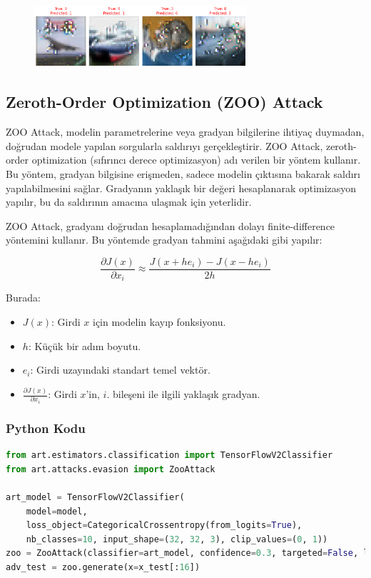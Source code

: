 \begin{figure}[h]
    \centering
    \includegraphics[width=0.7\textwidth]{images/wasserstein_attack_results.png}
    \caption{}
\end{figure}

\newpage

\subsection{Zeroth-Order Optimization (ZOO) Attack}

ZOO Attack, modelin parametrelerine veya gradyan bilgilerine ihtiyaç duymadan, doğrudan modele yapılan sorgularla saldırıyı gerçekleştirir. ZOO Attack, zeroth-order optimization (sıfırıncı derece optimizasyon) adı verilen bir yöntem kullanır. Bu yöntem, gradyan bilgisine erişmeden, sadece modelin çıktısına bakarak saldırı yapılabilmesini sağlar. Gradyanın yaklaşık bir değeri hesaplanarak optimizasyon yapılır, bu da saldırının amacına ulaşmak için yeterlidir.

ZOO Attack, gradyanı doğrudan hesaplamadığından dolayı finite-difference yöntemini kullanır. Bu yöntemde gradyan tahmini aşağıdaki gibi yapılır:

\[ \frac{\partial J(x)}{\partial x_i} \approx \frac{J(x + h e_i) - J(x - h e_i)}{2h} \]

Burada:

\begin{itemize}
    \item $J(x)$: Girdi $x$ için modelin kayıp fonksiyonu.
    \item $h$: Küçük bir adım boyutu.
    \item $e_i$: Girdi uzayındaki standart temel vektör.
    \item $\frac{\partial J(x)}{\partial x_i}$: Girdi $x$'in, $i$. bileşeni ile ilgili yaklaşık gradyan.
\end{itemize}

\subsubsection{Python Kodu}

\begin{lstlisting}[language=Python]
from art.estimators.classification import TensorFlowV2Classifier
from art.attacks.evasion import ZooAttack

art_model = TensorFlowV2Classifier(
    model=model, 
    loss_object=CategoricalCrossentropy(from_logits=True),
    nb_classes=10, input_shape=(32, 32, 3), clip_values=(0, 1))
zoo = ZooAttack(classifier=art_model, confidence=0.3, targeted=False, learning_rate=0.1)
adv_test = zoo.generate(x=x_test[:16])
\end{lstlisting}

\newpage